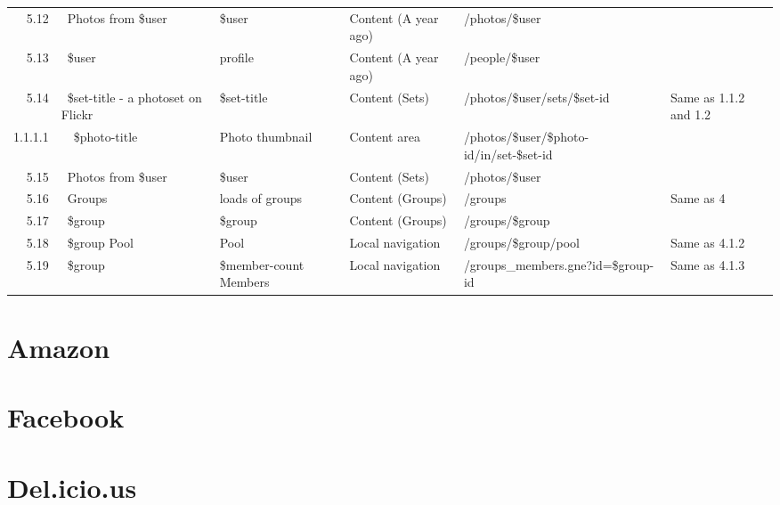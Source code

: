 \documentclass[12pt,a4paper]{article}
\begin{document}
\begin{landscape}
\begin{table}[h!b!p!]
\begin{center}
\begin{tiny}
\begin{tabular}{r|l|l|l|l|p{3cm}}
              5.12 &
              ~Photos from \$user &
              \$user &
              Content (A year ago) &
              /photos/\$user &
              \\

              5.13 &
              ~\$user &
              profile &
              Content (A year ago) &
              /people/\$user &
              \\

              5.14 &
              ~\$set-title - a photoset on Flickr &
              \$set-title &
              Content (Sets) &
              /photos/\$user/sets/\$set-id &
              Same as 1.1.2 and 1.2 \\

                1.1.1.1 &
                ~~\$photo-title &
                Photo thumbnail &
                Content area &
                /photos/\$user/\$photo-id/in/set-\$set-id &
                \\

              5.15 &
              ~Photos from \$user &
              \$user &
              Content (Sets) &
              /photos/\$user &
              \\

              5.16 &
              ~Groups &
              loads of groups &
              Content (Groups) &
              /groups &
              Same as 4\\

              5.17 &
              ~\$group &
              \$group &
              Content (Groups) &
              /groups/\$group &
              \\

              5.18 &
              ~\$group Pool &
              Pool &
              Local navigation &
              /groups/\$group/pool &
              Same as 4.1.2 \\

              5.19 &
              ~\$group  &
              \$member-count Members &
              Local navigation &
              /groups\_members.gne?id=\$group-id &
              Same as 4.1.3 \\

          \end{tabular}
        \rm
      \end{tiny}
    \end{center}
  \end{table}
\end{landscape}

\section{Amazon}

\section{Facebook}

\section{Del.icio.us}
\end{document}
